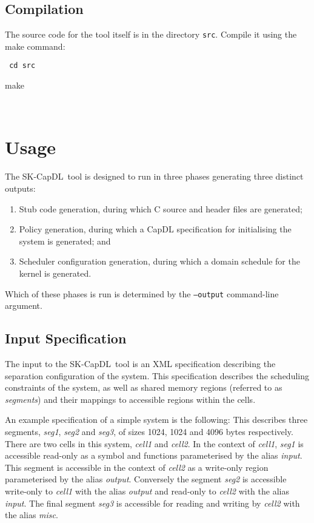 \documentclass[a4paper,11pt,twoside]{report}
\newcommand{\skcapdl}{SK-CapDL}
\newcommand{\skentity}[1]{\emph{#1}}
\newcommand{\term}[1]{{\it #1}}
\newcommand{\code}[1]{\\[+4pt]
{{\tt \hphantom{    } #1}}\\[+4pt]
}
\begin{document}
  \section{\label{sec:compilation}Compilation}
The source code for the tool itself is in the directory {\tt src}.
Compile it using the make command:
\code{
    cd src

    make
}

  \chapter{\label{s:usage}Usage}
The \skcapdl~tool is designed to run in three phases generating three distinct
outputs:
\begin{enumerate}
  \item Stub code generation, during which C source and header files are
    generated;
  \item Policy generation, during which a CapDL specification for initialising
    the system is generated; and
  \item Scheduler configuration generation, during which a domain schedule for
    the kernel is generated.
\end{enumerate}
Which of these phases is run is determined by the {\tt --output} command-line
argument.

  \section{\label{sec:input}Input Specification}
The input to the \skcapdl~tool is an XML specification describing the
separation configuration of the system.
This specification describes the scheduling constraints of the system, as well
as shared memory regions (referred to as \term{segments}) and their mappings to
accessible regions within the cells.

An example specification of a simple system is the following:
\vspace{6pt}
{}
\vspace{6pt}
This describes three segments, \skentity{seg1}, \skentity{seg2} and
\skentity{seg3}, of sizes 1024, 1024 and
4096 bytes respectively.
There are two cells in this system, \skentity{cell1} and \skentity{cell2}.
In the context of \skentity{cell1}, \skentity{seg1} is accessible read-only as a
symbol and functions parameterised by the alias \skentity{input}.
This segment is accessible in the context of \skentity{cell2} as a write-only
region parameterised by the alias \skentity{output}.
Conversely the segment \skentity{seg2} is accessible write-only to
\skentity{cell1} with the alias \skentity{output} and read-only to
\skentity{cell2} with the alias \skentity{input}.
The final segment \skentity{seg3} is accessible for reading and writing by
\skentity{cell2} with the alias \skentity{misc}.
\end{document}
